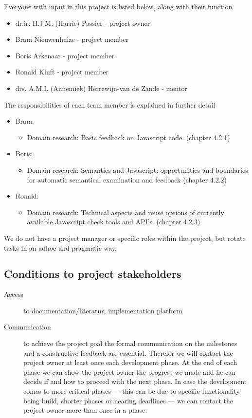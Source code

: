\documentclass{article}
\begin{document}
Everyone with input in this 
project is listed below, along with their function. \begin{itemize} \item dr.ir. 
H.J.M. (Harrie) Passier - project owner \item Bram Nieuwenhuize - project member 
\item Boris Arkenaar - project member \item Ronald Kluft - project member \item 
drs. A.M.I. (Annemiek) Herrewijn-van de Zande - mentor \end{itemize} The 
responsibilities of each team member is explained in further detail 
\begin{itemize} \item Bram: \begin{itemize} \item Domain research: Basic feedback on 
Javascript code. (chapter 
4.2.1) \end{itemize} \item Boris: \begin{itemize} \item Domain research: 
Semantics and Javascript: opportunities and boundaries for automatic semantical 
examination and feedback (chapter 4.2.2) \end{itemize} \item Ronald: 
\begin{itemize} \item Domain research: Technical aspects and reuse options of 
currently available Javascript check tools and API's. (chapter 4.2.3) 
\end{itemize} \end{itemize} 

We do not have a project manager or specific roles within the project, but 
rotate tasks in an adhoc and pragmatic way. 

\subsection{Conditions to project stakeholders} 

\begin{description}
\item[Access]
to documentation/literatur, implementation platform 
\item[Communication]
to achieve the project goal the formal communication on the milestones and a 
constructive feedback are essential. Therefor we will contact the project owner 
at least once each development phase. At the end of each phase we can show the 
project owner the progress we made and he can decide if and how to proceed with 
the next phase. In case the development comes to more critical phases --- this 
can be due to specific functionality being build, shorter phases or nearing 
deadlines --- we can contact the project owner more than once in a phase. 
\end{description}
\end{document}
